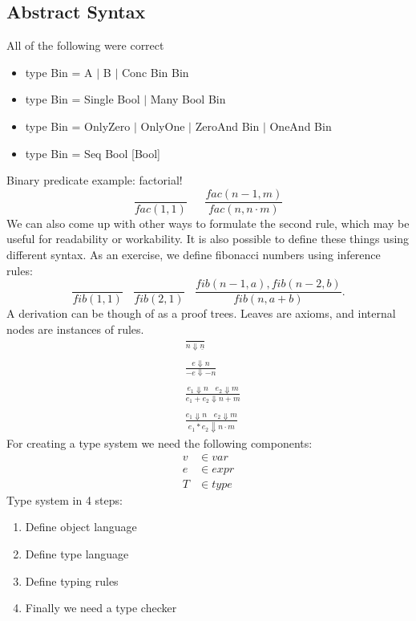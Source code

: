 \documentclass{article}
\theoremstyle{definition}
\begin{document}
\subsection{Abstract Syntax}
All of the following were correct
\begin{itemize}
    \item type Bin = A $|$ B $|$ Conc Bin Bin
    \item type Bin = Single Bool $|$ Many Bool Bin
    \item type Bin = OnlyZero $|$ OnlyOne $|$ ZeroAnd Bin $|$ OneAnd Bin
    \item type Bin = Seq Bool [Bool]
\end{itemize}
Binary predicate example: factorial!
\[
    \frac{}{fac(1,1)} \ \ \ \ \ \ \ \frac{fac(n-1,m)}{fac(n,n\cdot m)}  
\]
We can also come up with other ways to formulate the second rule, which may be useful for readability or workability.
It is also possible to define these things using different syntax.
As an exercise, we define fibonacci numbers using inference rules:
\[
    \frac{}{fib(1,1)} \ \ \ \ \frac{}{fib(2,1)} \ \ \ \ \frac{fib(n-1,a), fib(n-2,b)}{fib(n,a+b)}
.\]
A derivation can be though of as a proof trees. Leaves are axioms, and internal nodes are instances of rules.
\begin{align*}
    & \frac{}{n \Downarrow \underline{n}} \\\\
    & \frac{e \Downarrow n}{-e \Downarrow -n} \\\\
    & \frac{e_1 \Downarrow n \ \ \ \ e_2 \Downarrow m}{e_1 + e_2 \Downarrow n + m} \\\\
    & \frac{e_1 \Downarrow n \ \ \ \ e_2 \Downarrow m}{e_1 * e_2 \Downarrow n \cdot m}
\end{align*}
For creating a type system we need the following components:
\begin{align*}
    v &\in var \\
    e &\in expr \\
    T &\in type 
\end{align*}
Type system in 4 steps:
\begin{enumerate}
    \item Define object language
    \item Define type language
    \item Define typing rules
    \item Finally we need a type checker
\end{enumerate}
\end{document}
